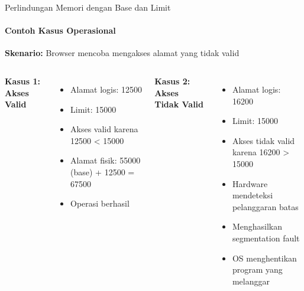 \documentclass[10pt,aspectratio=169]{beamer}
\begin{document}
\begin{frame}{Perlindungan Memori dengan Base dan Limit}
    \framesubtitle{Contoh Kasus Operasional}
    
    \textbf{Skenario:} Browser mencoba mengakses alamat yang tidak valid
    
    \begin{columns}[T]
            \textbf{Kasus 1: Akses Valid}
            \begin{itemize}
                \item Alamat logis: 12500
                \item Limit: 15000
                \item Akses valid karena 12500 < 15000
                \item Alamat fisik: 55000 (base) + 12500 = 67500
                \item Operasi berhasil
            \end{itemize}
            
            \textbf{Kasus 2: Akses Tidak Valid}
            \begin{itemize}
                \item Alamat logis: 16200
                \item Limit: 15000
                \item Akses tidak valid karena 16200 > 15000
                \item Hardware mendeteksi pelanggaran batas
                \item Menghasilkan segmentation fault
                \item OS menghentikan program yang melanggar
            \end{itemize}
    \end{columns}
\end{frame}
\end{document}
